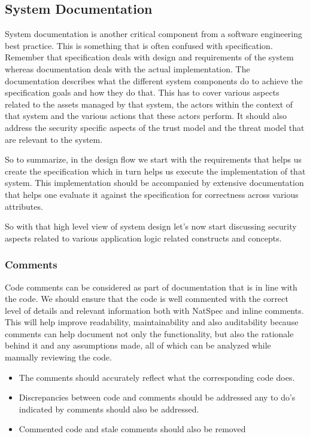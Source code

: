\subsection{System Documentation}\label{system-documentation}

System documentation is another critical component from a software
engineering best practice. This is something that is often confused with
specification. Remember that specification deals with design and
requirements of the system whereas documentation deals with the actual
implementation. The documentation describes what the different system
components do to achieve the specification goals and how they do that.
This has to cover various aspects related to the assets managed by that
system, the actors within the context of that system and the various
actions that these actors perform. It should also address the security
specific aspects of the trust model and the threat model that are
relevant to the system.

So to summarize, in the design flow we start with the requirements that
helps us create the specification which in turn helps us execute the
implementation of that system. This implementation should be accompanied
by extensive documentation that helps one evaluate it against the
specification for correctness across various attributes.

So with that high level view of system design let's now start discussing
security aspects related to various application logic related constructs
and concepts.

\subsubsection{Comments}\label{comments}

Code comments can be considered as part of documentation that is in line
with the code. We should ensure that the code is well commented with the
correct level of details and relevant information both with NatSpec and
inline comments. This will help improve readability, maintainability and
also auditability because comments can help document not only the
functionality, but also the rationale behind it and any assumptions
made, all of which can be analyzed while manually reviewing the code.

\begin{itemize}
\tightlist
\item
  The comments should accurately reflect what the corresponding code
  does.
\item
  Discrepancies between code and comments should be addressed any to
  do's indicated by comments should also be addressed.
\item
  Commented code and stale comments should also be removed
\end{itemize}

